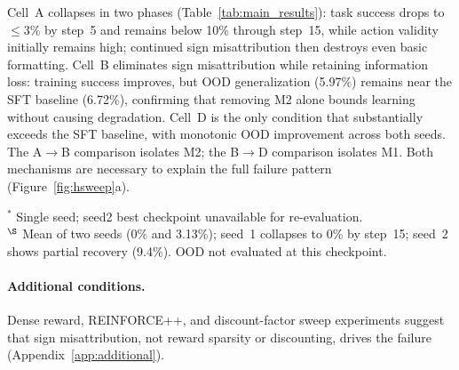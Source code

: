 Cell~A collapses in two phases (Table~\ref{tab:main_results}): task success drops to ${\leq}$3\% by step~5 and remains below 10\% through step~15, while action validity initially remains high; continued sign misattribution then destroys even basic formatting.
Cell~B eliminates sign misattribution while retaining information loss: training success improves, but OOD generalization (5.97\%) remains near the SFT baseline (6.72\%), confirming that removing M2 alone bounds learning without causing degradation.
Cell~D is the only condition that substantially exceeds the SFT baseline, with monotonic OOD improvement across both seeds.
The A$\to$B comparison isolates M2; the B$\to$D comparison isolates M1. Both mechanisms are necessary to explain the full failure pattern (Figure~\ref{fig:hsweep}a).

\begin{table}[t]
\centering
\caption{1.7B results on ALFWorld (best checkpoint per seed). Full seed-level breakdown in Table~\ref{tab:seed_variability} and Appendix~\ref{tab:additional_baselines}.}
\label{tab:main_results}
\begin{flushleft}
\small $^\ast$ Single seed; seed2 best checkpoint unavailable for re-evaluation. \\
\small $^\S$ Mean of two seeds (0\% and 3.13\%); seed~1 collapses to 0\% by step~15; seed~2 shows partial recovery (9.4\%). OOD not evaluated at this checkpoint.
\end{flushleft}
\end{table}

\paragraph{Additional conditions.} Dense reward, REINFORCE++, and discount-factor sweep experiments suggest that sign misattribution, not reward sparsity or discounting, drives the failure (Appendix~\ref{app:additional}).

